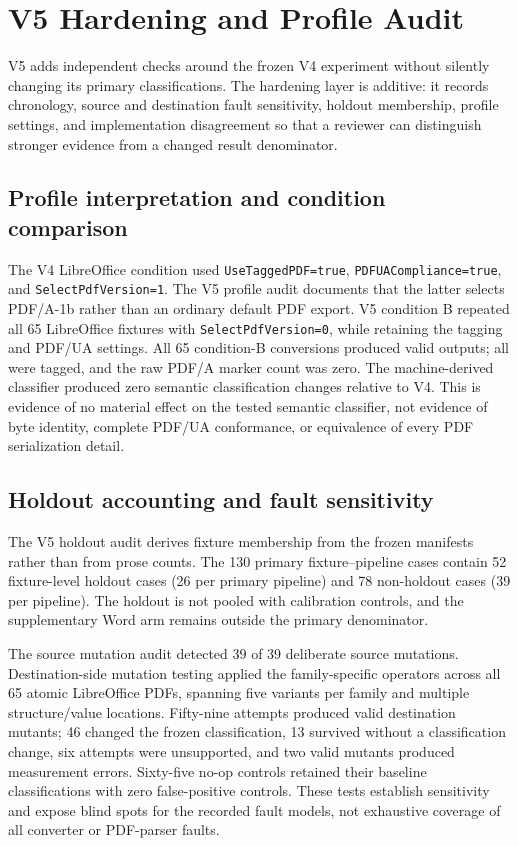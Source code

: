 \section{V5 Hardening and Profile Audit}
\label{sec:v5-hardening}

V5 adds independent checks around the frozen V4 experiment without silently changing its primary classifications. The hardening layer is additive: it records chronology, source and destination fault sensitivity, holdout membership, profile settings, and implementation disagreement so that a reviewer can distinguish stronger evidence from a changed result denominator.

\subsection{Profile interpretation and condition comparison}
\label{sec:v5-profile}

The V4 LibreOffice condition used \texttt{UseTaggedPDF=true}, \texttt{PDFUACompliance=true}, and \texttt{SelectPdfVersion=1}. The V5 profile audit documents that the latter selects PDF/A-1b rather than an ordinary default PDF export. V5 condition B repeated all 65 LibreOffice fixtures with \texttt{SelectPdfVersion=0}, while retaining the tagging and PDF/UA settings. All 65 condition-B conversions produced valid outputs; all were tagged, and the raw PDF/A marker count was zero. The machine-derived classifier produced zero semantic classification changes relative to V4. This is evidence of no material effect on the tested semantic classifier, not evidence of byte identity, complete PDF/UA conformance, or equivalence of every PDF serialization detail.

\subsection{Holdout accounting and fault sensitivity}
\label{sec:v5-holdout}

The V5 holdout audit derives fixture membership from the frozen manifests rather than from prose counts. The 130 primary fixture--pipeline cases contain 52 fixture-level holdout cases (26 per primary pipeline) and 78 non-holdout cases (39 per pipeline). The holdout is not pooled with calibration controls, and the supplementary Word arm remains outside the primary denominator.

The source mutation audit detected 39 of 39 deliberate source mutations. Destination-side mutation testing applied the family-specific operators across all 65 atomic LibreOffice PDFs, spanning five variants per family and multiple structure/value locations. Fifty-nine attempts produced valid destination mutants; 46 changed the frozen classification, 13 survived without a classification change, six attempts were unsupported, and two valid mutants produced measurement errors. Sixty-five no-op controls retained their baseline classifications with zero false-positive controls. These tests establish sensitivity and expose blind spots for the recorded fault models, not exhaustive coverage of all converter or PDF-parser faults.

